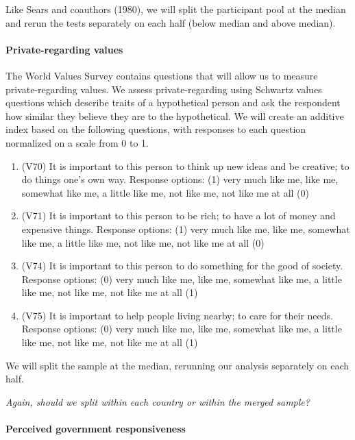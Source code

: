\documentclass[]{article}
\let\oldparagraph\paragraph
\renewcommand{\paragraph}[1]{\oldparagraph{#1}\mbox{}}
\begin{document}
Like Sears and coauthors (1980), we will split the participant pool at
the median and rerun the tests separately on each half (below median and
above median).

\paragraph{Private-regarding values}\label{private-regarding-values}

The World Values Survey contains questions that will allow us to measure
private-regarding values. We assess private-regarding using Schwartz
values questions which describe traits of a hypothetical person and ask
the respondent how similar they believe they are to the hypothetical. We
will create an additive index based on the following questions, with
responses to each question normalized on a scale from 0 to 1.

\begin{enumerate}
  \item (V70) It is important to this person to think up new ideas and be creative; to do things one’s own way. Response options: (1) very much like me, like me, somewhat like me, a little like me, not like me, not like me at all (0)
  \item (V71) It is important to this person to be rich; to have a lot of money and expensive things. Response options: (1) very much like me, like me, somewhat like me, a little like me, not like me, not like me at all (0)
  \item (V74) It is important to this person to do something for the good of society. Response options: (0) very much like me, like me, somewhat like me, a little like me, not like me, not like me at all (1)
  \item (V75) It is important to help people living nearby; to care for their needs. Response options: (0) very much like me, like me, somewhat like me, a little like me, not like me, not like me at all (1)
\end{enumerate}

We will split the sample at the median, rerunning our analysis
separately on each half.

\textit{Again, should we split within each country or within the merged sample?}

\paragraph{Perceived government
responsiveness}\label{perceived-government-responsiveness}
\end{document}

